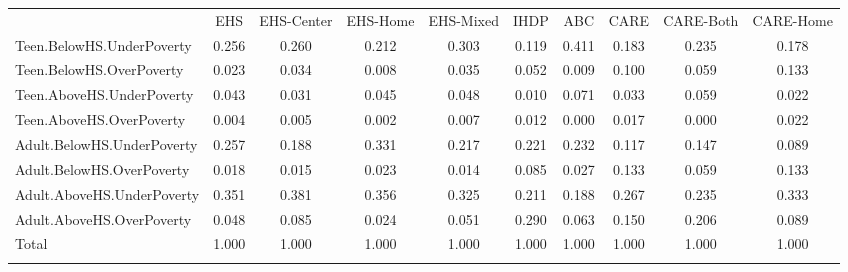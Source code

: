 \begin{tabular}{lccccccccc}
\hline \noalign{\smallskip} & EHS & EHS-Center & EHS-Home & EHS-Mixed & IHDP & ABC & CARE & CARE-Both & CARE-Home\\
\noalign{\smallskip}\hline \noalign{\smallskip}Teen.BelowHS.UnderPoverty & 0.256 & 0.260 & 0.212 & 0.303 & 0.119 & 0.411 & 0.183 & 0.235 & 0.178\\
Teen.BelowHS.OverPoverty & 0.023 & 0.034 & 0.008 & 0.035 & 0.052 & 0.009 & 0.100 & 0.059 & 0.133\\
Teen.AboveHS.UnderPoverty & 0.043 & 0.031 & 0.045 & 0.048 & 0.010 & 0.071 & 0.033 & 0.059 & 0.022\\
Teen.AboveHS.OverPoverty & 0.004 & 0.005 & 0.002 & 0.007 & 0.012 & 0.000 & 0.017 & 0.000 & 0.022\\
Adult.BelowHS.UnderPoverty & 0.257 & 0.188 & 0.331 & 0.217 & 0.221 & 0.232 & 0.117 & 0.147 & 0.089\\
Adult.BelowHS.OverPoverty & 0.018 & 0.015 & 0.023 & 0.014 & 0.085 & 0.027 & 0.133 & 0.059 & 0.133\\
Adult.AboveHS.UnderPoverty & 0.351 & 0.381 & 0.356 & 0.325 & 0.211 & 0.188 & 0.267 & 0.235 & 0.333\\
Adult.AboveHS.OverPoverty & 0.048 & 0.085 & 0.024 & 0.051 & 0.290 & 0.063 & 0.150 & 0.206 & 0.089\\
Total & 1.000 & 1.000 & 1.000 & 1.000 & 1.000 & 1.000 & 1.000 & 1.000 & 1.000\\
\noalign{\smallskip}\hline\end{tabular}\\
